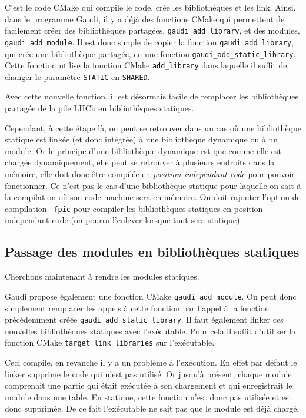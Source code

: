 \documentclass[a4paper]{report}
\begin{document}
C'est le code CMake qui compile le code, crée les bibliothèques et les link.
Ainsi, dans le programme Gaudi, il y a déjà des fonctions CMake qui permettent de facilement créer des bibliothèques partagées, \verb'gaudi_add_library', et des modules, \verb'gaudi_add_module'.
Il est donc simple de copier la fonction \verb'gaudi_add_library', qui crée une bibliothèque partagée, en une fonction \verb'gaudi_add_static_library'.
Cette fonction utilise la fonction CMake \verb'add_library' dans laquelle il suffit de changer le paramètre \verb'STATIC' en \verb'SHARED'.

Avec cette nouvelle fonction, il est désormais facile de remplacer les bibliothèques partagée de la pile LHCb en bibliothèques statiques.

Cependant, à cette étape là, on peut se retrouver dans un cas où une bibliothèque statique est linkée (et donc intégrée) à une bibliothèque dynamique ou à un module.
Or le principe d'une bibliothèque dynamique est que comme elle est chargée dynamiquement, elle peut se retrouver à plusieurs endroits dans la mémoire, elle doit donc être compilée en \emph{position-independant code} pour pouvoir fonctionner.
Ce n'est pas le cas d'une bibliothèque statique pour laquelle on sait à la compilation où son code machine sera en mémoire.
On doit rajouter l'option de compilation \verb'-fpic' pour compiler les bibliothèques statiques en position-independant code (on pourra l'enlever lorsque tout sera statique).

\subsection{Passage des modules en bibliothèques statiques}
Cherchons maintenant à rendre les modules statiques.

Gaudi propose également une fonction CMake \verb'gaudi_add_module'.
On peut donc simplement remplacer les appels à cette fonction par l'appel à la fonction précédemment créée \verb'gaudi_add_static_library'.
Il faut également linker ces nouvelles bibliothèques statiques avec l'exécutable.
Pour cela il suffit d'utiliser la fonction CMake \verb'target_link_libraries' sur l'exécutable.

Ceci compile, en revanche il y a un problème à l'exécution.
En effet par défaut le linker supprime le code qui n'est pas utilisé.
Or jusqu'à présent, chaque module comprenait une partie qui était exécutée à son chargement et qui enregistrait le module dans une table.
En statique, cette fonction n'est donc pas utilisée et est donc supprimée.
De ce fait l'exécutable ne sait pas que le module est déjà chargé.
\end{document}
